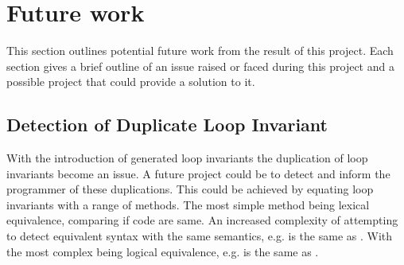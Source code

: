 








\section{Future work}

This section outlines potential future work from the result of this project.
Each section gives a brief outline of an issue raised or faced during this
project and a possible project that could provide a solution to it.

\subsection{Detection of Duplicate Loop Invariant}

With the introduction of generated loop invariants the duplication of loop
invariants become an issue.
A future project could be to detect and inform the programmer of these
duplications.
This could be achieved by equating loop invariants with a range of methods.
The most simple method being lexical equivalence, comparing if code are same.
An increased complexity of attempting to detect equivalent syntax with the same
semantics, e.g.  is the same as .
With the most complex being logical equivalence, e.g.  is the same
as .


